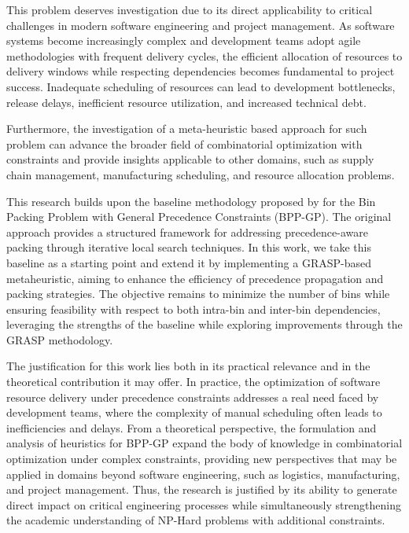\documentclass[12pt]{article}
\begin{document}
This problem deserves investigation due to its direct applicability to critical challenges in modern software engineering and project management. As software systems become increasingly complex and development teams adopt agile methodologies with frequent delivery cycles, the efficient allocation of resources to delivery windows while respecting dependencies becomes fundamental to project success. Inadequate scheduling of resources can lead to development bottlenecks, release delays, inefficient resource utilization, and increased technical debt.

Furthermore, the investigation of a meta-heuristic based approach for such problem can advance the broader field of combinatorial optimization with constraints and provide insights applicable to other domains, such as supply chain management, manufacturing scheduling, and resource allocation problems.

This research builds upon the baseline methodology proposed by \cite{kramer:17} for the Bin Packing Problem with General Precedence Constraints (BPP-GP). The original approach provides a structured framework for addressing precedence-aware packing through iterative local search techniques. In this work, we take this baseline as a starting point and extend it by implementing a GRASP-based metaheuristic, aiming to enhance the efficiency of precedence propagation and packing strategies. The objective remains to minimize the number of bins while ensuring feasibility with respect to both intra-bin and inter-bin dependencies, leveraging the strengths of the baseline while exploring improvements through the GRASP methodology.

The justification for this work lies both in its practical relevance and in the theoretical contribution it may offer. In practice, the optimization of software resource delivery under precedence constraints addresses a real need faced by development teams, where the complexity of manual scheduling often leads to inefficiencies and delays. From a theoretical perspective, the formulation and analysis of heuristics for BPP-GP expand the body of knowledge in combinatorial optimization under complex constraints, providing new perspectives that may be applied in domains beyond software engineering, such as logistics, manufacturing, and project management. Thus, the research is justified by its ability to generate direct impact on critical engineering processes while simultaneously strengthening the academic understanding of NP-Hard problems with additional constraints.
\end{document}
